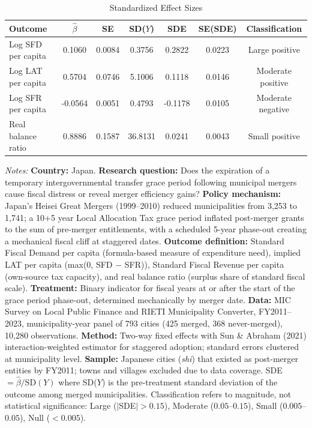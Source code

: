 \begin{table}[htbp]
\centering
\caption{Standardized Effect Sizes}
\label{tab:sde}
\begin{tabular}{lcccccc}
\hline\hline
Outcome & $\hat{\beta}$ & SE & SD($Y$) & SDE & SE(SDE) & Classification \\
\hline
Log SFD per capita & 0.1060 & 0.0084 & 0.3756 & 0.2822 & 0.0223 & Large positive \\
Log LAT per capita & 0.5704 & 0.0746 & 5.1006 & 0.1118 & 0.0146 & Moderate positive \\
Log SFR per capita & -0.0564 & 0.0051 & 0.4793 & -0.1178 & 0.0105 & Moderate negative \\
Real balance ratio & 0.8886 & 0.1587 & 36.8131 & 0.0241 & 0.0043 & Small positive \\
\hline\hline
\end{tabular}
\begin{tablenotes}
\item \textit{Notes:} \textbf{Country:} Japan. \textbf{Research question:} Does the expiration of a temporary intergovernmental transfer grace period following municipal mergers cause fiscal distress or reveal merger efficiency gains? \textbf{Policy mechanism:} Japan's Heisei Great Mergers (1999--2010) reduced municipalities from 3,253 to 1,741; a 10+5 year Local Allocation Tax grace period inflated post-merger grants to the sum of pre-merger entitlements, with a scheduled 5-year phase-out creating a mechanical fiscal cliff at staggered dates. \textbf{Outcome definition:} Standard Fiscal Demand per capita (formula-based measure of expenditure need), implied LAT per capita (max(0, SFD $-$ SFR)), Standard Fiscal Revenue per capita (own-source tax capacity), and real balance ratio (surplus share of standard fiscal scale). \textbf{Treatment:} Binary indicator for fiscal years at or after the start of the grace period phase-out, determined mechanically by merger date. \textbf{Data:} MIC Survey on Local Public Finance and RIETI Municipality Converter, FY2011--2023, municipality-year panel of 793 cities (425 merged, 368 never-merged), 10,280 observations. \textbf{Method:} Two-way fixed effects with Sun \& Abraham (2021) interaction-weighted estimator for staggered adoption; standard errors clustered at municipality level. \textbf{Sample:} Japanese cities (\textit{shi}) that existed as post-merger entities by FY2011; towns and villages excluded due to data coverage. SDE $= \hat{\beta} / \text{SD}(Y)$ where SD($Y$) is the pre-treatment standard deviation of the outcome among merged municipalities. Classification refers to magnitude, not statistical significance: Large ($|$SDE$| > 0.15$), Moderate ($0.05$--$0.15$), Small ($0.005$--$0.05$), Null ($< 0.005$).
\end{tablenotes}
\end{table}

